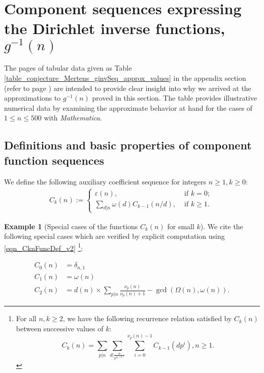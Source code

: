 \documentclass[11pt,reqno,a4letter]{article}
\numberwithin{figure}{section}
\numberwithin{table}{section}
\newcommand{\seqnum}[1]{\href{http://oeis.org/#1}{\color{ProcessBlue}{\underline{#1}}}}
\theoremstyle{plain}
\numberwithin{theorem}{section}
\theoremstyle{definition}
\newtheorem{example}[theorem]{Example}
\newcommand{\NBRef}[1]{}
\begin{document}
\newpage
\section{Component sequences expressing the Dirichlet inverse functions, $g^{-1}(n)$} 
\label{Section_InvFunc_PreciseExpsAndAsymptotics} 

The pages of tabular data given as Table \ref{table_conjecture_Mertens_ginvSeq_approx_values} 
in the appendix section (refer to 
page \pageref{table_conjecture_Mertens_ginvSeq_approx_values}) are intended to 
provide clear insight into why we arrived at the approximations to 
$g^{-1}(n)$ proved in this section. The table provides illustrative 
numerical data by examining the approximate behavior 
at hand for the cases of $1 \leq n \leq 500$ with \emph{Mathematica}. 

\subsection{Definitions and basic properties of component function sequences} 

We define the following auxiliary coefficient sequence for integers $n \geq 1, k \geq 0$: 
\begin{align} 
\label{eqn_CknFuncDef_v2} 
C_k(n) := \begin{cases} 
     \varepsilon(n), & \text{ if $k = 0$; } \\ 
     \sum\limits_{d|n} \omega(d) C_{k-1}(n/d), & \text{ if $k \geq 1$. } 
     \end{cases} 
\end{align} 

\begin{example}[Special cases of the functions $C_k(n)$ for small $k$] 
\label{example_SpCase_Ckn} 
We cite the following special cases which are verified by 
explicit computation using \eqref{eqn_CknFuncDef_v2} 
\cite[\seqnum{A066922}]{OEIS}\footnote{ 
     For all $n,k \geq 2$, we have the following recurrence 
     relation satisfied by $C_k(n)$ between successive values of $k$: 
     \begin{equation*}
     C_k(n) = \sum_{p|n} \sum_{d\rvert\frac{n}{p^{\nu_p(n)}}} \sum_{i=0}^{\nu_p(n)-1} 
          C_{k-1}\left(dp^i\right), n \geq 1. 
     \end{equation*}
}: 
\NBRef{A07-2020-04-26} 
\begin{align*} 
C_0(n) & = \delta_{n,1} \\ 
C_1(n) & = \omega(n) \\ 
C_2(n) & = d(n) \times \sum_{p|n} \frac{\nu_p(n)}{\nu_p(n)+1} - \gcd\left(\Omega(n), \omega(n)\right). 
\end{align*} 
\end{example} 
\end{document}
